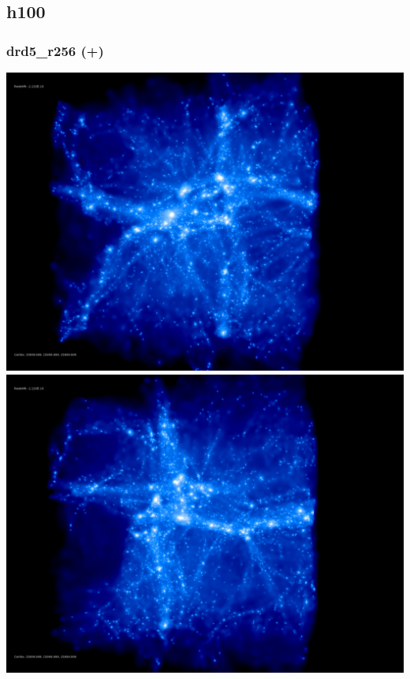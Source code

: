 \documentclass[a4paper,11pt,fleqn,oneside]{book}
\begin{document}
\newpage
\subsection{h100} %

\subsubsection{drd5\_r256 (+)} 

\includegraphics[scale=0.12]{drd5_r256/rotate_00185.jpg} 
\includegraphics[scale=0.12]{drd5_r256/rotate_00136.jpg} 
\end{document}
